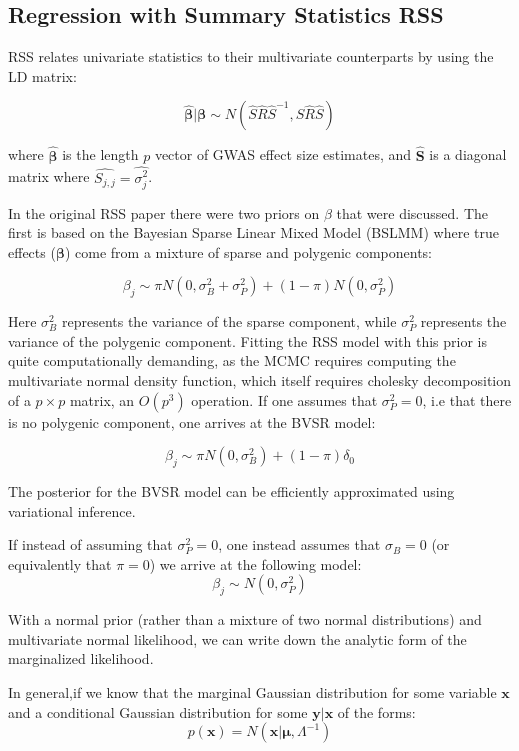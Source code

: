 \subsection{Regression with Summary Statistics RSS}\label{sec:orgb0b15e2}

RSS relates univariate statistics to their multivariate counterparts by using the LD matrix:

$$ \hat{\boldsymbol{\beta}} | \boldsymbol{\beta} \sim N(\hat{S}\hat{R}\hat{S}^{-1},\hat{S}\hat{R}\hat{S}) $$

where \(\hat{\boldsymbol{\beta}}\) is the length $p$ vector of GWAS effect size estimates, and $\hat{\textbf{S}}$ is a diagonal matrix where $\hat{S_{j,j}}=\hat{\sigma_j^2}$.

In the original RSS paper there were two priors on \(\beta\) that were discussed.  The first is based on the Bayesian Sparse Linear Mixed Model (BSLMM) \cite{bslmm} where true effects ($\boldsymbol{\beta}$)
come from a mixture of sparse and polygenic components:

$$ \beta_j \sim \pi N(0,\sigma^2_B+\sigma^2_P)+(1-\pi) N(0,\sigma^2_P) $$

Here \(\sigma^2_B\) represents the variance of the sparse component, while \(\sigma^2_P\) represents the variance of the polygenic component. Fitting the RSS model with this prior is quite computationally demanding, 
as the MCMC requires computing the multivariate normal density function, which itself requires cholesky decomposition of a \(p \times p\) matrix, an \(O(p^3)\) operation.  If one assumes that \(\sigma^2_P=0\),
i.e that there is no polygenic component, one arrives at the BVSR model:

$$ \beta_j \sim \pi N(0,\sigma^2_B)+(1-\pi) \delta_0 $$

The posterior for the BVSR model can be efficiently approximated using variational inference. 

If instead of assuming that \(\sigma^2_P=0\), one instead assumes that \(\sigma_B=0\) (or equivalently that \(\pi=0\)) we arrive at the following model: 
$$ \beta_j \sim N(0,\sigma^2_P)$$

With a normal prior (rather than a mixture of two normal distributions) and multivariate normal likelihood, we can write down the analytic form of the marginalized likelihood\cite{patternrecognition}.

In general,if we know that the marginal Gaussian distribution for some variable \(\textbf{x}\) and a conditional Gaussian distribution for some \(\textbf{y}|\textbf{x}\) of the forms:
$$p(\textbf{x}) = N(\textbf{x}|\boldsymbol{\mu},\Lambda^{-1})$$

